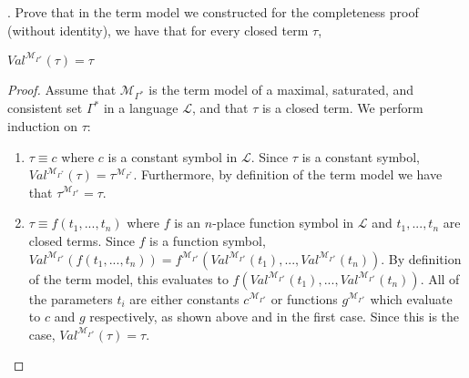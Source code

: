 \documentclass[11pt]{article}
\begin{document}
. Prove that in the term model we constructed for the completeness proof (without identity), we have that for every closed term $\tau$,
\begin{center}
    $Val^{\mathcal{M}_{\Gamma^*}}(\tau) = \tau$
\end{center}
\color{RoyalBlue}
\begin{proof}
Assume that $\mathcal{M}_{\Gamma^*}$ is the term model of a maximal, saturated, and consistent set $\Gamma^*$ in a language $\mathcal{L}$, and that $\tau$ is a closed term. We perform induction on $\tau$:

\begin{enumerate}[1)]
    \item $\tau \equiv c$ where $c$ is a constant symbol in $\mathcal{L}$. Since $\tau$ is a constant symbol, $Val^{\mathcal{M}_{\Gamma^*}}(\tau) = \tau^{\mathcal{M}_{\Gamma^*}}$. Furthermore, by definition of the term model we have that $\tau^{\mathcal{M}_{\Gamma^*}} = \tau$.
    \item $\tau \equiv f(t_1, ..., t_n)$ where $f$ is an $n$-place function symbol in $\mathcal{L}$ and $t_1, ..., t_n$ are closed terms. Since $f$ is a function symbol, $Val^{\mathcal{M}_{\Gamma^*}}(f(t_1, ..., t_n)) = f^{\mathcal{M}_{\Gamma^*}}(Val^{\mathcal{M}_{\Gamma^*}}(t_1), ..., Val^{\mathcal{M}_{\Gamma^*}}(t_n))$. By definition of the term model, this evaluates to $f(Val^{\mathcal{M}_{\Gamma^*}}(t_1), ..., Val^{\mathcal{M}_{\Gamma^*}}(t_n))$. All of the parameters $t_i$ are either constants $c^{\mathcal{M}_{\Gamma^*}}$ or functions $g^{\mathcal{M}_{\Gamma^*}}$ which evaluate to $c$ and $g$ respectively, as shown above and in the first case. Since this is the case, $Val^{\mathcal{M}_{\Gamma^*}}(\tau) = \tau$.
\end{enumerate}

\end{proof}
\color{black}
\end{document}
